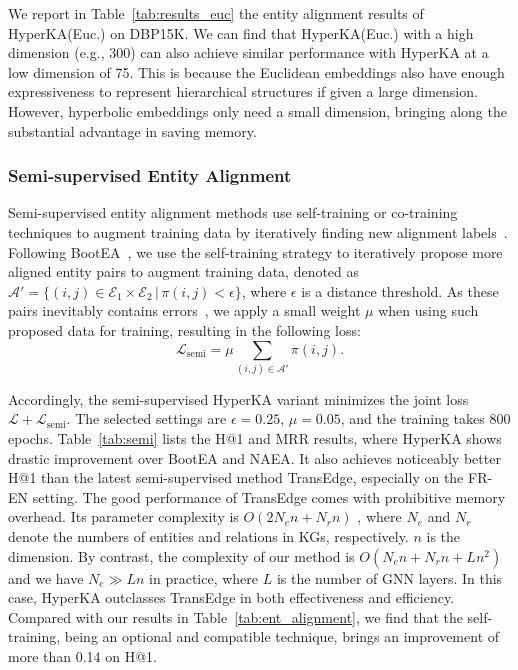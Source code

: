\documentclass[11pt,a4paper]{article}
\newcommand{\modelname}{HyperKA\xspace}
\begin{document}
We report in Table~\ref{tab:results_euc} the entity alignment results of \modelname (Euc.) on DBP15K. We can find that \modelname (Euc.) with a high dimension (e.g., 300) can also achieve similar performance with \modelname at a low dimension of 75. This is because the Euclidean embeddings also have enough expressiveness to represent hierarchical structures if given a large dimension. However, hyperbolic embeddings only need a small dimension, bringing along the substantial advantage in saving memory.

\subsubsection{Semi-supervised Entity Alignment}
\label{sect:semi}
Semi-supervised entity alignment methods use self-training or co-training techniques to augment training data by iteratively finding new alignment labels~\cite{BootEA,NAEA,TransEdge}. Following BootEA~\cite{BootEA}, we use the self-training strategy to iteratively propose more aligned entity pairs to augment training data, denoted as $\mathcal{A}'=\{(i,j)\in\mathcal{E}_1 \times\mathcal{E}_2 \,|\,\pi(i, j) < \epsilon \}$, where $\epsilon$ is a distance threshold. As these pairs inevitably contains errors~\cite{BootEA}, we apply a small weight $\mu$ when using such proposed data for training, resulting in the following loss:
\begin{equation}
  \label{eq:semi_loss}
  \mathcal{L}_{\text{semi}}=\mu \sum_{(i,j)\in\mathcal{A}'}\pi(i,j).
\end{equation}

Accordingly, the semi-supervised \modelname variant minimizes the joint loss $\mathcal{L}+\mathcal{L}_{\text{semi}}$. The selected settings are $\epsilon=0.25$, $\mu=0.05$, and the training takes 800 epochs. Table~\ref{tab:semi} lists the H@1 and MRR results, where \modelname shows drastic improvement over BootEA and NAEA. It also achieves noticeably better H@1 than the latest semi-supervised method TransEdge, especially on the FR-EN setting. The good performance of TransEdge comes with prohibitive memory overhead. Its parameter complexity is $O(2N_en+N_rn)$ \cite{TransEdge}, where $N_e$ and $N_r$ denote the numbers of entities and relations in KGs, respectively. $n$ is the dimension. By contrast, the complexity of our method is $O(N_en+N_rn+Ln^2)$ and we have $N_e \gg Ln$ in practice, where $L$ is the number of GNN layers. In this case, \modelname outclasses TransEdge in both effectiveness and efficiency. Compared with our results in Table~\ref{tab:ent_alignment}, we find that the self-training, being an optional and compatible technique, brings an improvement of more than 0.14 on H@1.
\end{document}
